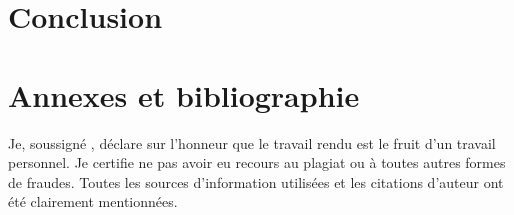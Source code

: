 \documentclass[a4paper,oneside,11pt]{book}
\begin{document}
\part{Conclusion}


\part{Annexes et bibliographie}

\appendix
\renewcommand{\thechapter}{}
\renewcommand{\thesection}{\Alph{section}}

\clearpage
{}
{}
\nocite{*} %
\printbibliography


Je, soussigné \authorname, déclare sur l'honneur que le travail rendu est le fruit d'un travail personnel. Je certifie ne pas avoir eu recours au plagiat ou à toutes autres formes de fraudes. Toutes les sources d'information utilisées et les citations d'auteur ont été clairement mentionnées.
\end{document}
